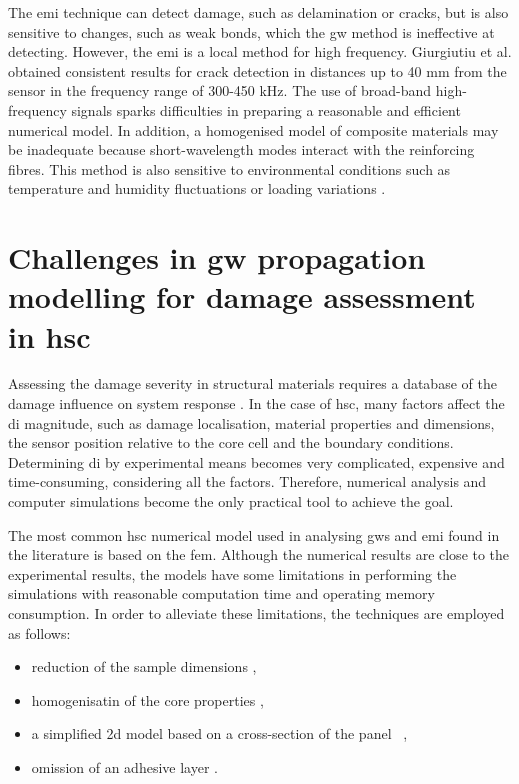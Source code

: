 \documentclass[11pt,a4paper,final]{report}
\theoremstyle{plain}
\begin{document}
The \ac{emi} technique can detect damage, such as delamination or cracks, but is also sensitive to changes, such as weak bonds, which the \ac{gw} method is ineffective at detecting.
However, the \ac{emi} is a local method for high frequency.
Giurgiutiu et al. \cite{giurgiutiu2001electro} obtained consistent results for crack detection in distances up to 40 \unit{\mm} from the sensor in the frequency range of 300-450 \unit{\kHz}.
The use of broad-band high-frequency signals sparks difficulties in preparing a reasonable and efficient numerical model.
In addition, a homogenised model of composite materials may be inadequate because short-wavelength modes interact with the reinforcing fibres.
This method is also sensitive to environmental conditions such as temperature and humidity fluctuations \cite{bhalla2002practical} or loading variations \cite{lim2011impedance}. \section{Challenges in \acl{gw} propagation modelling for damage assessment in \acl{hsc}}
\label{sec:challenges}

Assessing the damage severity in structural materials requires a database of the damage influence on system response \cite{worden2007fundamental}.
In the case of \ac{hsc}, many factors affect the \ac{di} magnitude, such as damage localisation, material properties and dimensions, the sensor position relative to the core cell and the boundary conditions.
Determining \ac{di} by experimental means becomes very complicated, expensive and time-consuming, considering all the factors.
Therefore, numerical analysis and computer simulations become the only practical tool to achieve the goal.

The most common \ac{hsc} numerical model used in analysing \acp{gw} and \ac{emi} found in the literature is based on the \ac{fem}.
Although the numerical results are close to the experimental results, the models have some limitations in performing the simulations with reasonable computation time and operating memory consumption.
In order to alleviate these limitations, the techniques are employed as follows:
\begin{itemize}
\item reduction of the sample dimensions \cite{hosseini2013numerical, tian2015wavenumber},
\item homogenisatin of the core properties \cite{catapano2014multi, zhou2020debonding},
\item a simplified \ac{2d} model based on a cross-section of the panel~ \cite{li2019detection},
\item omission of an adhesive layer \cite{mustapha2013non}.
\end{itemize}
\end{document}
